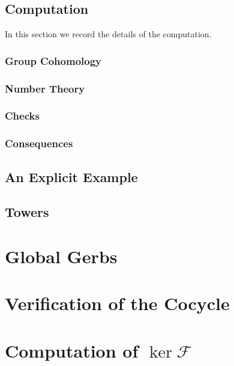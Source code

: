 \documentclass{article}
\numberwithin{equation}{section}
\begin{document}
\subsection{Computation}
In this section we record the details of the computation.

\subsubsection{Group Cohomology}


\subsubsection{Number Theory}


\subsubsection{Checks}


\subsubsection{Consequences}


\subsection{An Explicit Example}


\subsection{Towers}


\section{Global Gerbs}


\printbibliography[title={References}]

\newpage
\appendix
\section{Verification of the Cocycle} \label{sec:verifycocycle}


\section{Computation of \texorpdfstring{$\ker\mathcal F$}{ker F}} \label{sec:havegensproof}

\end{document}
